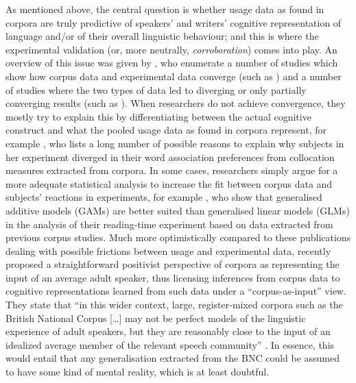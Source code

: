 As mentioned above, the central question is whether usage data as found in corpora are truly predictive of speakers' and writers' cognitive representation of language and\slash or of their overall linguistic behaviour; and this is where the experimental validation (or, more neutrally, \textit{corroboration}) comes into play.
An overview of this issue was given by \cite{NewmanSorensenduncan2015}, who enumerate a number of studies which show how corpus data and experimental data converge (such as \citealp{BresnanEa2007,DurrantDoherty2010,GriesWulff2005,GriesEa2005}) and a number of studies where the two types of data led to diverging or only partially converging results (such as \citealp{ArppeJaervikivi2007,Dabrowska2014,Mollin2009}).
When researchers do not achieve convergence, they mostly try to explain this by differentiating between the actual cognitive construct and what the pooled usage data as found in corpora represent, for example \citet[411]{Dabrowska2014}, who lists a long number of possible reasons to explain why subjects in her experiment diverged in their word association preferences from collocation measures extracted from corpora.
In some cases, researchers simply argue for a more adequate statistical analysis to increase the fit between corpus data and subjects' reactions in experiments, for example \cite{DivjakEa2016}, who show that generalised additive models (GAMs) are better suited than generalised linear models (GLMs) in the analysis of their reading-time experiment based on data extracted from previous corpus studies.
Much more optimistically compared to these publications dealing with possible frictions between usage and experimental data, \cite{StefanowitschFlach2016} recently proposed a straightforward positivist perspective of corpora as representing the input of an average adult speaker, thus licensing inferences from corpus data to cognitive representations learned from such data under a ``corpus-as-input'' view.
They state that ``in this wider context, large, register-mixed corpora such as the British National Corpus [\ldots] may not be perfect models of the linguistic experience of adult speakers, but they are reasonably close to the input of an idealized average member of the relevant speech community'' \citep[104]{StefanowitschFlach2016}.
In essence, this would entail that any generalisation extracted from the BNC could be assumed to have some kind of mental reality, which is at least doubtful.

